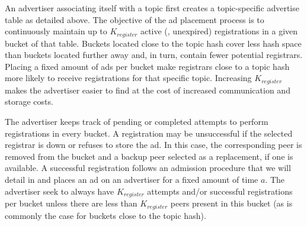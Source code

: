 An advertiser associating itself with a topic first creates a topic-specific advertise table as detailed above.
The objective of the ad placement process is to continuously maintain up to $K_\textit{register}$ active (\ie, unexpired) registrations in a given bucket of that table.
%
Buckets located close to the topic hash cover less hash space than buckets located further away and, in turn, contain fewer potential registrars. 
Placing a fixed amount of ads per bucket make registrars close to a topic hash more likely to receive registrations for that specific topic. 
Increasing $K_\textit{register}$ makes the advertiser easier to find at the cost of increased communication and storage costs.



The advertiser keeps track of pending or completed attempts to perform registrations in every bucket.
A registration may be unsuccessful if the selected registrar is down or refuses to store the ad.
In this case, the corresponding peer is removed from the bucket and a backup peer selected as a replacement, if one is available.
A successful registration follows an admission procedure that we will detail in  and places an ad on an advertiser for a fixed amount of time $a$.
The advertiser seek to always have $K_\textit{register}$ attempts and/or
successful registrations per bucket unless there are less than $K_\textit{register}$ peers present in this bucket (as is commonly the case for buckets close to the topic hash).

